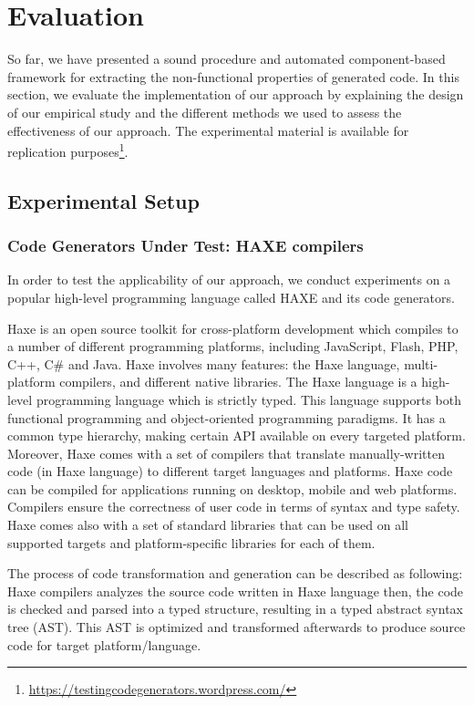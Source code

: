 \section{Evaluation}
So far, we have presented a sound procedure and automated component-based framework for extracting the non-functional properties of generated code. In this section, we evaluate the implementation of our approach by explaining the design of our empirical study and the different methods we used to assess the effectiveness of our approach. 
The experimental material is available for replication purposes\footnote{\url{https://testingcodegenerators.wordpress.com/}}.
\subsection{Experimental Setup}
\subsubsection{Code Generators Under Test: HAXE compilers}
In order to test the applicability of our approach, we conduct experiments on a popular high-level programming language called HAXE and its code generators.

Haxe is an open source toolkit for cross-platform development which compiles to a number of different programming platforms, including JavaScript, Flash, PHP, C++, C\# and Java. Haxe involves many features: the Haxe language, multi-platform compilers, and different native libraries. 
The Haxe language is a high-level programming language which is strictly typed. This language supports both functional programming and object-oriented programming paradigms. It has a common type hierarchy, making certain API available on every targeted platform.
Moreover, Haxe comes with a set of compilers that translate manually-written code (in Haxe language) to different target languages and platforms. 
Haxe code can be compiled for applications running on desktop, mobile and web platforms. Compilers ensure the correctness of user code in terms of syntax and type safety.
Haxe comes also with a set of standard libraries that can be used on all supported targets and platform-specific libraries for each of them.

The process of code transformation and generation can be described as following: Haxe compilers analyzes the source code written in Haxe language then, the code is checked and parsed into a typed structure, resulting in a typed abstract syntax tree (AST). This AST is optimized and transformed afterwards to produce source code for target platform/language.

